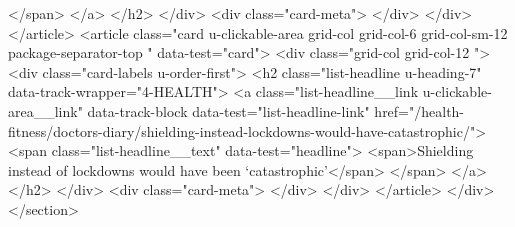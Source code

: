 {{{</span>
</a>
</h2>
</div>
<div class="card-meta">
</div>
</div>
</article>
<article class="card u-clickable-area grid-col grid-col-6 grid-col-sm-12 package-separator-top " data-test="card">
<div class="grid-col grid-col-12  ">
<div class="card-labels u-order-first">
<h2 class="list-headline  u-heading-7" data-track-wrapper="4-HEALTH">
<a class="list-headline__link u-clickable-area__link" data-track-block data-test="list-headline-link" href="/health-fitness/doctors-diary/shielding-instead-lockdowns-would-have-catastrophic/">
<span class="list-headline__text" data-test="headline">
<span>Shielding instead of lockdowns would have been ‘catastrophic’</span>
</span>
</a>
</h2>
</div>
<div class="card-meta">
</div>
</div>
</article>
</div>
</section>

	
		
			
		
}}}
